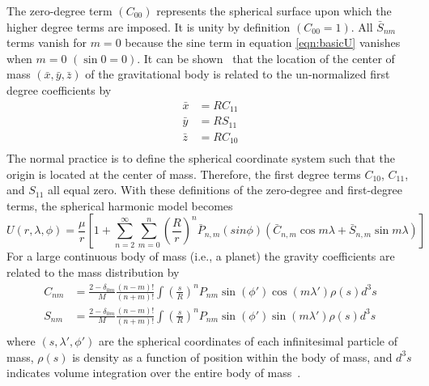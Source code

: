 The zero-degree term $(C_{00})$ represents the spherical surface 
upon which the higher degree terms are imposed. It is unity by definition
$(C_{00}=1)$.
All $\bar{S}_{nm}$ terms vanish for $m=0$ because the sine term in equation
\ref{eqn:basicU} vanishes when $m=0$
$(\sin 0=0)$.  It can be shown~\cite{montenbruck2000,torge2001} that the
location of the center of mass $(\bar{x},\bar{y},\bar{z})$ of the gravitational
body is related to the un-normalized first degree coefficients by
\begin{equation}\label{degree1coefficients}
\begin{aligned}
\bar{x} &=R C_{11}\\
\bar{y} &=R S_{11}\\
\bar{z} &=R C_{10}\\
\end{aligned}
\end{equation}
The normal practice is to define the spherical coordinate system such that the
origin is located at the center of mass. Therefore, the first degree terms
$C_{10}$, $C_{11}$, and $S_{11}$ all equal zero.  With these definitions of the
zero-degree and first-degree terms, the spherical harmonic model becomes
\begin{equation}
\label{spherharmon2}
U(r,\lambda,\phi)=\frac{\mu}{r}\left[1+\sum_{n=2}^\infty\sum_{m=0}^n
\left(\frac{R}{r}\right)^n\bar{P}_{n,m}(sin\phi)(\bar{C}_{n,m}\cos
m\lambda+\bar{S}_{n,m}\sin m\lambda)\right]
\end{equation}
For a large continuous body of mass (i.e., a planet) the gravity coefficients
are related to the mass distribution by
\begin{equation}\label{CandSdefined}
\begin{aligned}
C_{nm}&=\frac{2-\delta_{0m}}{M}\frac{(n-m)!}{(n+m)!}\int\left(\frac{s}{R}\right)^n
P_{nm}\sin(\phi')\cos(m\lambda')\rho(s)d^3s\\
S_{nm}&=\frac{2-\delta_{0m}}{M}\frac{(n-m)!}{(n+m)!}\int\left(\frac{s}{R}\right)^n
P_{nm}\sin(\phi')\sin(m\lambda')\rho(s)d^3s\\
\end{aligned}
\end{equation}
where $(s,\lambda',\phi')$ are the spherical coordinates of each infinitesimal
particle of mass, $\rho(s)$ is density as a function of position within the
body of mass, and $d^3s$ indicates volume integration over the entire body of
mass~\cite{montenbruck2000}.

